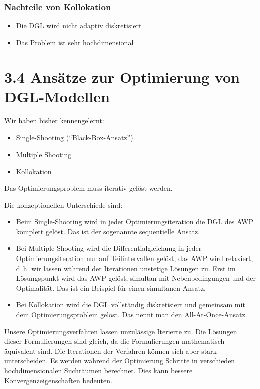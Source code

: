 \subsubsection*{Nachteile von Kollokation}

\begin{itemize}
\item Die DGL wird nicht adaptiv diskretisiert
\item Das Problem ist sehr hochdimensional
\end{itemize}


\section*{3.4 Ansätze zur Optimierung von DGL-Modellen}

Wir haben bisher kennengelernt:

\begin{itemize}
\item Single-Shooting ("`Black-Box-Ansatz"')
\item Multiple Shooting 
\item Kollokation
\end{itemize}

Das Optimierungsproblem muss iterativ gelöst werden.

Die konzeptionellen Unterschiede sind:

\begin{itemize}
\item Beim Single-Shooting wird in jeder Optimierungsiteration die DGL des AWP komplett gelöst. Das ist der sogenannte sequentielle Ansatz.
\item Bei Multiple Shooting wird die Differentialgleichung in jeder Optimierungsiteration nur auf Teilintervallen gelöst, das AWP wird relaxiert, d.\,h. wir lassen während der Iterationen unstetige Lösungen zu. Erst im Lösungspunkt wird das AWP gelöst, simultan mit Nebenbedingungen und der Optimalität. Das ist ein Beispiel für einen simultanen Ansatz.
\item Bei Kollokation wird die DGL vollständig diskretisiert und gemeinsam mit dem Optimierungsproblem gelöst. Das nennt man den All-At-Once-Ansatz.
\end{itemize}

Unsere Optimierungsverfahren lassen unzulässige Iterierte zu. Die Lösungen dieser Formulierungen sind gleich, da die Formulierungen mathematisch äquivalent sind. Die Iterationen der Verfahren können sich aber stark unterscheiden. Es werden während der Optimierung Schritte in verschieden hochdimensionalen Suchräumen berechnet. Dies kann bessere Konvergenzeigenschaften bedeuten.

